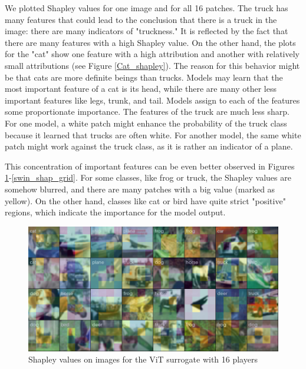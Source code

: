 \documentclass[magisterska,en]{pracamgr}
\begin{document}
We plotted Shapley values for one image and for all 16 patches. The truck has many features that could lead to the conclusion that there is a truck in the image: there are many indicators of "truckness." It is reflected by the fact that there are many features with a high Shapley value. On the other hand, the plots for the "cat" show one feature with a high attribution and another with relatively small attributions (see Figure \ref{Cat_shapley}). The reason for this behavior might be that cats are more definite beings than trucks. Models may learn that the most important feature of a cat is its head, while there are many other less important features like legs, trunk, and tail. Models assign to each of the features some proportionate importance. The features of the truck are much less sharp. For one model, a white patch might enhance the probability of the truck class because it learned that trucks are often white. For another model, the same white patch might work against the truck class, as it is rather an indicator of a plane.

This concentration of important features can be even better observed in Figures \ref{vit_shap_grid}-\ref{swin_shap_grid}. For some classes, like frog or truck, the Shapley values are somehow blurred, and there are many patches with a big value (marked as yellow). On the other hand, classes like cat or bird have quite strict "positive" regions, which indicate the importance for the model output.



\pagebreak

\begin{figure}[H]
\centering
\includegraphics[scale=0.4]{./images/vit_shap_grid.png}
\caption{Shapley values on images for the ViT surrogate with 16 players}
\label{vit_shap_grid}
\end{figure}
\end{document}
